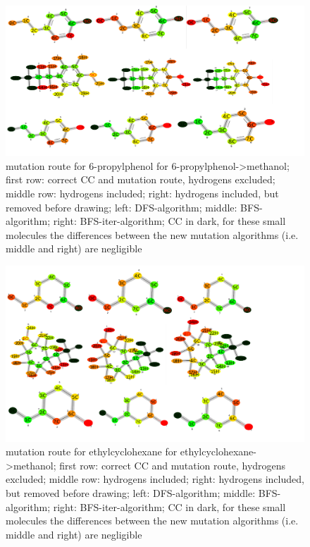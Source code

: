 \begin{figure}[H]
	
	\includegraphics[scale=0.75]{6propylphenol_set2}\caption{mutation route for 6-propylphenol for 6-propylphenol->methanol; first row: correct CC and mutation route, hydrogens excluded; middle row: hydrogens included; right: hydrogens included, but removed before drawing; left: DFS-algorithm; middle: BFS-algorithm; right: BFS-iter-algorithm; CC in dark, for these small molecules the differences between the new mutation algorithms (i.e. middle and right) are negligible}
	
\end{figure}

\begin{figure}[H]
	
	\includegraphics[scale=0.75]{ethylcyclohexane_set2}\caption{mutation route for ethylcyclohexane for ethylcyclohexane->methanol; first row: correct CC and mutation route, hydrogens excluded; middle row: hydrogens included; right: hydrogens included, but removed before drawing; left: DFS-algorithm; middle: BFS-algorithm; right: BFS-iter-algorithm; CC in dark, for these small molecules the differences between the new mutation algorithms (i.e. middle and right) are negligible}
	
\end{figure}

